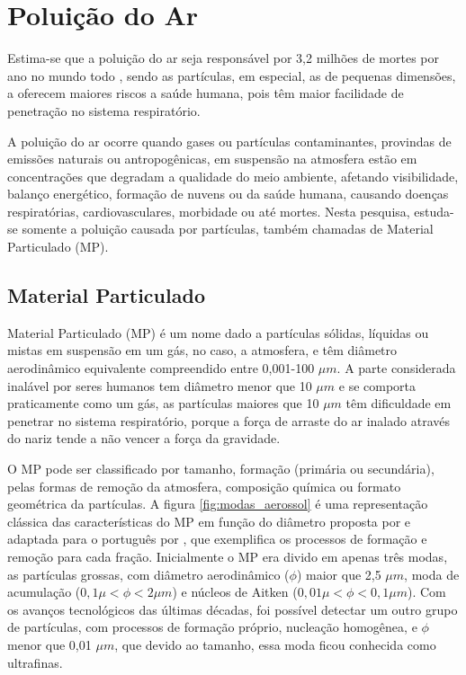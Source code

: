 \section{Poluição do Ar}

Estima-se que a poluição do ar seja responsável por 3,2 milhões de mortes 
por ano no mundo todo \citep{lim2013}, sendo as partículas, em especial, as 
de pequenas dimensões, a oferecem maiores riscos a saúde humana, pois têm 
maior facilidade de penetração no sistema respiratório.

A poluição do ar ocorre quando gases ou partículas contaminantes, 
provindas de emissões naturais ou antropogênicas, 
em suspensão na atmosfera estão em concentrações que degradam 
a qualidade do meio ambiente, afetando visibilidade, balanço energético, 
formação de nuvens ou da saúde humana, causando doenças respiratórias, 
cardiovasculares, morbidade ou até mortes. Nesta pesquisa, estuda-se somente 
a poluição causada por partículas, também chamadas de Material Particulado (MP).

\subsection{Material Particulado}

Material Particulado (MP) é um nome dado a partículas sólidas, líquidas ou 
mistas em suspensão em um gás, no caso, a atmosfera, e têm diâmetro 
aerodinâmico equivalente compreendido entre 0,001-100 $\mu m$. A parte 
considerada inalável por seres humanos tem diâmetro menor que 10 $\mu m$
e se comporta praticamente como um gás, as partículas maiores que 10 $\mu m$ 
têm dificuldade em penetrar no sistema respiratório, porque a força de arraste 
do ar inalado através do nariz tende a não vencer a força da gravidade.

O MP pode ser classificado por tamanho, formação (primária ou secundária), 
pelas formas de remoção da atmosfera, composição química ou formato 
geométrica da partículas\citep{seinfeld2012}. A figura \ref{fig:modas_aerossol} 
é uma representação clássica das características 
do MP em função do diâmetro proposta por \citet{finlayson1999} e adaptada 
para o português por \citet{oliveira2007}, que exemplifica os processos de 
formação e remoção para cada fração. Inicialmente o MP era divido em apenas 
três modas, as partículas grossas, com  diâmetro  aerodinâmico ($\phi$) 
maior que 2,5 $\mu m$, moda de acumulação ($ 0,1\mu <\phi< 2\mu m$) e 
núcleos de Aitken ($ 0,01\mu <\phi< 0,1\mu m$). Com os avanços tecnológicos
das últimas décadas, foi possível detectar um outro grupo de partículas,
com processos de formação próprio, nucleação homogênea, e $\phi$ menor que 
0,01 $\mu m$, que devido ao tamanho, essa moda ficou conhecida como ultrafinas.

